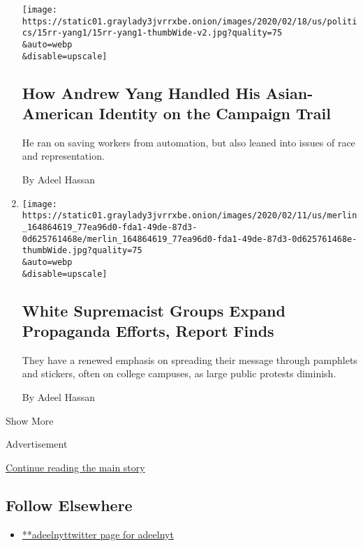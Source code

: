 \begin{enumerate}
  \texttt{[image: https://static01.graylady3jvrrxbe.onion/images/2020/02/18/us/politics/15rr-yang1/15rr-yang1-thumbWide-v2.jpg?quality=75\\\&auto=webp\\\&disable=upscale]}

  \hypertarget{how-andrew-yang-handled-his-asian-american-identity-on-the-campaign-trail}{%
  \subsection{How Andrew Yang Handled His Asian-American Identity on the
  Campaign
  Trail}\label{how-andrew-yang-handled-his-asian-american-identity-on-the-campaign-trail}}

  He ran on saving workers from automation, but also leaned into issues
  of race and representation.

  By Adeel Hassan
\item
  \href{/2020/02/12/us/white-supremacist-propaganda-campus.html}{}

  \texttt{[image: https://static01.graylady3jvrrxbe.onion/images/2020/02/11/us/merlin\_164864619\_77ea96d0-fda1-49de-87d3-0d625761468e/merlin\_164864619\_77ea96d0-fda1-49de-87d3-0d625761468e-thumbWide.jpg?quality=75\\\&auto=webp\\\&disable=upscale]}

  \hypertarget{white-supremacist-groups-expand-propaganda-efforts-report-finds}{%
  \subsection{White Supremacist Groups Expand Propaganda Efforts, Report
  Finds}\label{white-supremacist-groups-expand-propaganda-efforts-report-finds}}

  They have a renewed emphasis on spreading their message through
  pamphlets and stickers, often on college campuses, as large public
  protests diminish.

  By Adeel Hassan
\end{enumerate}

Show More

Advertisement

\protect\hyperlink{after-mid2}{Continue reading the main story}

\hypertarget{follow-elsewhere}{%
\subsection{Follow Elsewhere}\label{follow-elsewhere}}

\begin{itemize}
\tightlist
\item
  \href{https://twitter.com/adeelnyt}{**adeelnyttwitter page for
  adeelnyt}
\end{itemize}

